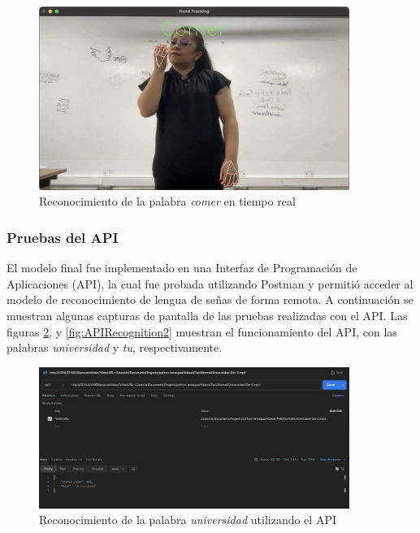 \begin{figure}[H]
    \centering
    \includegraphics[width=0.9\textwidth]{figuras/PruebaDemo2.png}
    \caption{Reconocimiento de la palabra \textit{comer} en tiempo real}
    \label{fig:RealTimeRecognition2}
\end{figure}

\subsubsection{Pruebas del API}

El modelo final fue implementado en una Interfaz de Programación de Aplicaciones (API), la cual fue probada utilizando Postman y permitió acceder al modelo de reconocimiento de lengua de señas de forma remota.
A continuación se muestran algunas capturas de pantalla de las pruebas realizadas con el API.
Las figuras \ref{fig:APIRecognition1}, y \ref{fig:APIRecognition2} muestran el funcionamiento del API, con las palabras \textit{universidad} y \textit{tu}, respectivamente.

\begin{figure}[H]
    \centering
    \includegraphics[width=0.9\textwidth]{figuras/PruebaAPI1.png}
    \caption{Reconocimiento de la palabra \textit{universidad} utilizando el API}
    \label{fig:APIRecognition1}
\end{figure}

